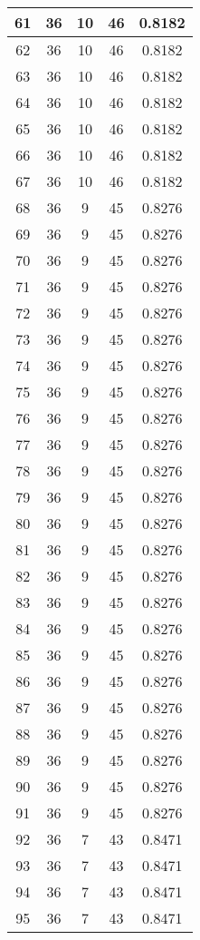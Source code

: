 \documentclass[letterpaper, 12pt]{article}
\begin{document}
\begin{longtable}{|c|c|c|c|c|}
61 & 36 & 10 & 46 & 0.8182 \\
\hline
62 & 36 & 10 & 46 & 0.8182 \\
\hline
63 & 36 & 10 & 46 & 0.8182 \\
\hline
64 & 36 & 10 & 46 & 0.8182 \\
\hline
65 & 36 & 10 & 46 & 0.8182 \\
\hline
66 & 36 & 10 & 46 & 0.8182 \\
\hline
67 & 36 & 10 & 46 & 0.8182 \\
\hline
68 & 36 & 9 & 45 & 0.8276 \\
\hline
69 & 36 & 9 & 45 & 0.8276 \\
\hline
70 & 36 & 9 & 45 & 0.8276 \\
\hline
71 & 36 & 9 & 45 & 0.8276 \\
\hline
72 & 36 & 9 & 45 & 0.8276 \\
\hline
73 & 36 & 9 & 45 & 0.8276 \\
\hline
74 & 36 & 9 & 45 & 0.8276 \\
\hline
75 & 36 & 9 & 45 & 0.8276 \\
\hline
76 & 36 & 9 & 45 & 0.8276 \\
\hline
77 & 36 & 9 & 45 & 0.8276 \\
\hline
78 & 36 & 9 & 45 & 0.8276 \\
\hline
79 & 36 & 9 & 45 & 0.8276 \\
\hline
80 & 36 & 9 & 45 & 0.8276 \\
\hline
81 & 36 & 9 & 45 & 0.8276 \\
\hline
82 & 36 & 9 & 45 & 0.8276 \\
\hline
83 & 36 & 9 & 45 & 0.8276 \\
\hline
84 & 36 & 9 & 45 & 0.8276 \\
\hline
85 & 36 & 9 & 45 & 0.8276 \\
\hline
86 & 36 & 9 & 45 & 0.8276 \\
\hline
87 & 36 & 9 & 45 & 0.8276 \\
\hline
88 & 36 & 9 & 45 & 0.8276 \\
\hline
89 & 36 & 9 & 45 & 0.8276 \\
\hline
90 & 36 & 9 & 45 & 0.8276 \\
\hline
91 & 36 & 9 & 45 & 0.8276 \\
\hline
92 & 36 & 7 & 43 & 0.8471 \\
\hline
93 & 36 & 7 & 43 & 0.8471 \\
\hline
94 & 36 & 7 & 43 & 0.8471 \\
\hline
95 & 36 & 7 & 43 & 0.8471 \\

\end{longtable}
\end{document}
